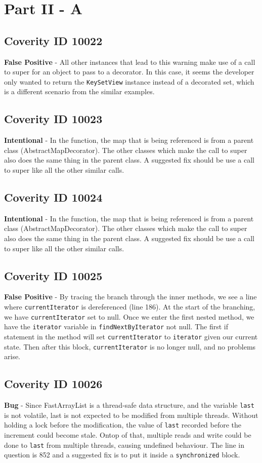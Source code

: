 \documentclass[12pt]{article}
\begin{document}
\section{Part II - A}
\subsection{Coverity ID 10022}
\textbf{False Positive} - All other instances that lead to this warning make use of a call to super for an object to pass to a decorator. In this case, it seems the developer only wanted to return the \texttt{KeySetView} instance instead of a decorated set, which is a different scenario from the similar examples.
\subsection{Coverity ID 10023}
\textbf{Intentional} - In the function, the map that is being referenced is from a parent class (AbstractMapDecorator). The other classes which make the call to super also does the same thing in the parent class. A suggested fix should be use a call to super like all the other similar calls.
\subsection{Coverity ID 10024}
\textbf{Intentional} - In the function, the map that is being referenced is from a parent class (AbstractMapDecorator). The other classes which make the call to super also does the same thing in the parent class. A suggested fix should be use a call to super like all the other similar calls.
\subsection{Coverity ID 10025}
\textbf{False Positive} - By tracing the branch through the inner methods, we see a line where \texttt{currentIterator} is dereferenced (line 186). At the start of the branching, we have \texttt{currentIterator} set to null. Once we enter the first nested method, we have the \texttt{iterator} variable in \texttt{findNextByIterator} not null. The first if statement in the method will set \texttt{currentIterator} to \texttt{iterator} given our current state. Then after this block, \texttt{currentIterator} is no longer null, and no problems arise.
\subsection{Coverity ID 10026}
\textbf{Bug} - Since FastArrayList is a thread-safe data structure, and the variable \texttt{last} is not volatile, last is not expected to be modified from multiple threads. Without holding a lock before the modification, the value of \texttt{last} recorded before the increment could become stale. Ontop of that, multiple reads and write could be done to \texttt{last} from multiple threads, causing undefined behaviour. The line in question is 852 and a suggested fix is to put it inside a \texttt{synchronized} block.
\end{document}
